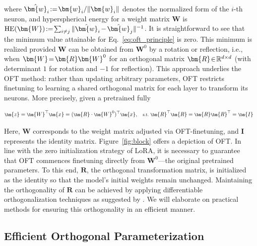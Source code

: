 where $\thickmuskip=2mu \medmuskip=2mu \hat{\bm{w}}_i:=\bm{w}_i/\|\bm{w}_i\|$ denotes the normalized form of the $i$-th neuron, and hyperspherical energy for a weight matrix $\bm{W}$ is $\thickmuskip=2mu \medmuskip=2mu \text{HE}(\bm{W}):= \sum_{i\neq j} \|\hat{\bm{w}}_i-\hat{\bm{w}}_j\|^{-1}$. It is straightforward to see that the minimum value attainable for Eq.~\eqref{eq:oft_principle} is zero. This minimum is realized provided $\bm{W}$ can be obtained from $\bm{W}^0$ by a rotation or reflection, i.e., when $\thickmuskip=2mu \medmuskip=2mu \bm{W}=\bm{R}\bm{W}^0$ for an orthogonal matrix $\thickmuskip=2mu \medmuskip=2mu \bm{R}\in\mathbb{R}^{d\times d}$ (with determinant $1$ for rotation and $-1$ for reflection). This approach underlies the OFT method: rather than updating arbitrary parameters, OFT restricts finetuning to learning a shared orthogonal matrix for each layer to transform its neurons. More precisely, given a pretrained fully

\begin{equation}\label{eq:oft_general}
    \footnotesize
    \bm{z} = \bm{W}^\top \bm{x} = (\bm{R} \cdot \bm{W}^0)^\top \bm{x},~~~\text{s.t.}~\bm{R}^\top \bm{R} = \bm{R}\bm{R}^\top = \bm{I}
\end{equation}

Here, $\bm{W}$ corresponds to the weight matrix adjusted via OFT-finetuning, and $\bm{I}$ represents the identity matrix. Figure~\ref{fig:block} offers a depiction of OFT. In line with the zero initialization strategy of LoRA, it is necessary to guarantee that OFT commences finetuning directly from $\bm{W}^0$—the original pretrained parameters. To this end, $\bm{R}$, the orthogonal transformation matrix, is initialized as the identity so that the model's initial weights remain unchanged. Maintaining the orthogonality of $\bm{R}$ can be achieved by applying differentiable orthogonalization techniques as suggested by \cite{liu2021orthogonal,lezcano2019cheap}. We will elaborate on practical methods for ensuring this orthogonality in an efficient manner.

\subsection{Efficient Orthogonal Parameterization}\label{sect:eff_ortho}

